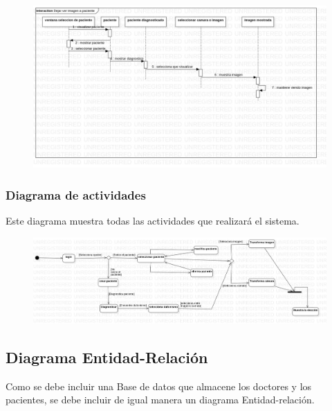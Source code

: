 \documentclass[10pt]{article}
\begin{document}
\begin{figure}[H]
	\begin{center}
\includegraphics[scale = 0.40]{UML/Collaboration4!Interaction1!Dejar_ver_imagen_a_paciente_9.jpg}
	\end{center} 
\end{figure}
\newpage

\subsubsection{Diagrama de actividades}

Este diagrama muestra todas las actividades que realizará el sistema.

\begin{figure}[H]
	\begin{center}
\includegraphics[scale = 0.30]{UML/Activity1!ActivityDiagram1_12.jpg}
	\end{center} 
\end{figure}

\subsection{Diagrama Entidad-Relación}

Como se debe incluir una Base de datos que almacene los doctores y los pacientes, se debe incluir de igual manera un diagrama Entidad-relación.
\end{document}
